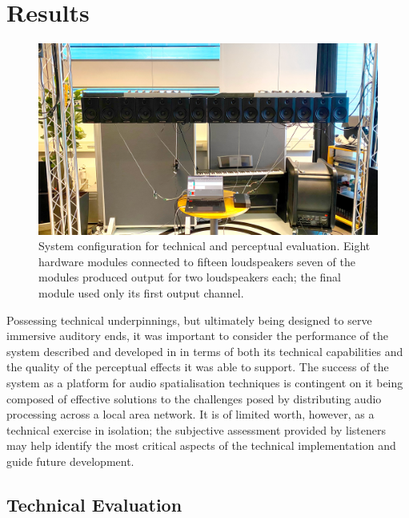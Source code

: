 \section{Results}\label{sec:results}

\begin{figure}[ht]
    \centering
    \includegraphics[width=\textwidth]{figures/eval-setup}
    \caption{
        System configuration for technical and perceptual evaluation.
        Eight hardware modules connected to fifteen loudspeakers \textemdash{}
        seven of the modules produced output for two loudspeakers each; the
        final module used only its first output channel.
    }
    \label{fig:eval-setup}
\end{figure}

Possessing technical underpinnings, but ultimately being designed to
serve immersive auditory ends, it was important to consider the performance of
the system described and developed in  in terms of
both its technical capabilities and the quality of the perceptual effects it
was able to support.
The success of the system as a platform for audio spatialisation techniques is
contingent on it being composed of effective solutions to the challenges posed
by distributing audio processing across a local area network.
It is of limited worth, however, as a technical exercise in isolation;
the subjective assessment provided by listeners may help identify the most
critical aspects of the technical implementation and guide future development.

\subsection{Technical Evaluation}\label{subsec:technical-evaluation}

